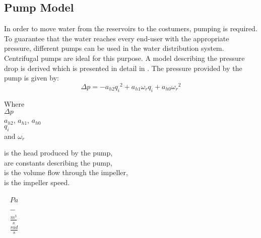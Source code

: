 \subsection{Pump Model} 
\label{PumpModel}
In order to move water from the reservoirs to the costumers, pumping is required. To guarantee that the water reaches every end-user with the appropriate pressure, different pumps can be used in the water distribution system.\\
Centrifugal pumps are ideal for this purpose. 
A model describing the pressure drop is derived which is presented in detail in \cite{Phd_Carsten}. The pressure provided by the pump is given by:
\begin{equation}
  \Delta p = -a_{h2}{q_i}^2 + a_{h1} \omega_r q_i + a_{h0}{\omega_r}^2
  \label{PumpModel}
\end{equation}

\begin{minipage}[t]{0.20\textwidth}
Where\\
\hspace*{8mm} $\Delta p$ \\
\hspace*{8mm} $a_{h2}$, $a_{h1}$, $a_{h0}$ \\
\hspace*{8mm} $q_i$ \\
and \hspace*{0.7mm} $\omega_r$ 

\end{minipage}
\begin{minipage}[t]{0.68\textwidth}
\vspace*{2mm}
is the head produced by the pump,\\
are constants describing the pump,\\
is the volume flow through the impeller,\\
is the impeller speed.
\end{minipage}
\begin{minipage}[t]{0.10\textwidth}
\vspace*{2mm}
\textcolor{White}{te}$\unit{Pa}$\\
\textcolor{White}{te}$\unit{-}$\\
\textcolor{White}{te}$\unit{\frac{m^3}{s}}$\\
\textcolor{White}{te}$\unit{\frac{rad}{s}}$
\end{minipage}	

